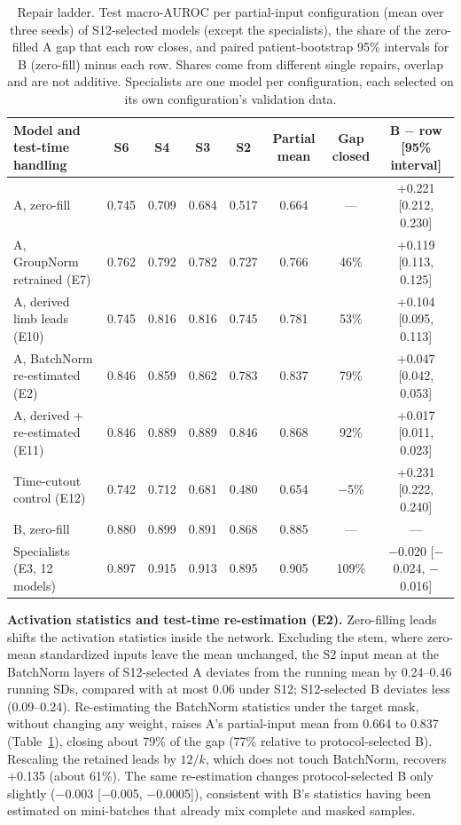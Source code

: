 \begin{table}[htbp]
\centering
\caption{Repair ladder. Test macro-AUROC per partial-input configuration (mean over three seeds) of S12-selected models (except the specialists), the share of the zero-filled A gap that each row closes, and paired patient-bootstrap 95\% intervals for B (zero-fill) minus each row. Shares come from different single repairs, overlap and are not additive. Specialists are one model per configuration, each selected on its own configuration's validation data.}
\label{tab:ladder}
\footnotesize\setlength{\tabcolsep}{3.5pt}
\begin{tabular}{lccccccc}
\toprule
Model and test-time handling & S6 & S4 & S3 & S2 & Partial mean & Gap closed & B $-$ row [95\% interval] \\
\midrule
A, zero-fill & 0.745 & 0.709 & 0.684 & 0.517 & 0.664 & --- & +0.221 [0.212, 0.230] \\
A, GroupNorm retrained (E7) & 0.762 & 0.792 & 0.782 & 0.727 & 0.766 & 46\% & +0.119 [0.113, 0.125] \\
A, derived limb leads (E10) & 0.745 & 0.816 & 0.816 & 0.745 & 0.781 & 53\% & +0.104 [0.095, 0.113] \\
A, BatchNorm re-estimated (E2) & 0.846 & 0.859 & 0.862 & 0.783 & 0.837 & 79\% & +0.047 [0.042, 0.053] \\
A, derived + re-estimated (E11) & 0.846 & 0.889 & 0.889 & 0.846 & 0.868 & 92\% & +0.017 [0.011, 0.023] \\
Time-cutout control (E12) & 0.742 & 0.712 & 0.681 & 0.480 & 0.654 & $-$5\% & +0.231 [0.222, 0.240] \\
B, zero-fill & 0.880 & 0.899 & 0.891 & 0.868 & 0.885 & --- & --- \\
Specialists (E3, 12 models) & 0.897 & 0.915 & 0.913 & 0.895 & 0.905 & 109\% & $-$0.020 [$-$0.024, $-$0.016] \\
\bottomrule
\end{tabular}
\end{table}

\textbf{Activation statistics and test-time re-estimation (E2).} Zero-filling leads shifts the activation statistics inside the network. Excluding the stem, where zero-mean standardized inputs leave the mean unchanged, the S2 input mean at the BatchNorm layers of S12-selected A deviates from the running mean by 0.24--0.46 running SDs, compared with at most 0.06 under S12; S12-selected B deviates less (0.09--0.24). Re-estimating the BatchNorm statistics under the target mask, without changing any weight, raises A's partial-input mean from 0.664 to 0.837 (Table~\ref{tab:ladder}), closing about 79\% of the gap (77\% relative to protocol-selected B). Rescaling the retained leads by $12/k$, which does not touch BatchNorm, recovers +0.135 (about 61\%). The same re-estimation changes protocol-selected B only slightly ($-$0.003 [$-$0.005, $-$0.0005]), consistent with B's statistics having been estimated on mini-batches that already mix complete and masked samples.

